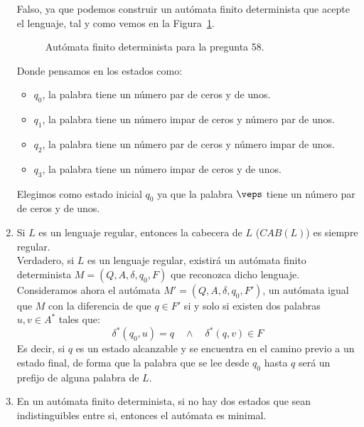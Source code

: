 \begin{enumerate}
        Falso, ya que podemos construir un autómata finito determinista que acepte el lenguaje, tal y como vemos en la Figura~\ref{fig:tipo_test58}.
       \begin{figure}[H]
           \centering
           \caption{Autómata finito determinista para la pregunta 58.}
           \label{fig:tipo_test58}
       \end{figure}
       Donde pensamos en los estados como:
       \begin{itemize}
           \item $q_0$, la palabra tiene un número par de ceros y de unos.
           \item $q_1$, la palabra tiene un número impar de ceros y número par de unos.
           \item $q_2$, la palabra tiene un número par de ceros y número impar de unos.
           \item $q_3$, la palabra tiene un número impar de ceros y de unos.
       \end{itemize}
       Elegimos como estado inicial $q_0$ ya que la palabra $\veps$ tiene un número par de ceros y de unos.
    \item Si $L$ es un lenguaje regular, entonces la cabecera de $L$ ($CAB(L)$) es siempre regular.\\

        Verdadero, si $L$ es un lenguaje regular, existirá un autómata finito determinista $M=(Q,A,\delta,q_0,F)$ que reconozca dicho lenguaje. Consideramos ahora el autómata $M'=(Q,A,\delta,q_0,F')$, un autómata igual que $M$ con la diferencia de que $q\in F'$ si y solo si existen dos palabras $u,v\in A^\ast$ tales que:
        \begin{equation*}
            \delta^\ast(q_0,u) = q \quad \land \quad \delta^\ast(q,v) \in F
        \end{equation*}
        Es decir, si $q$ es un estado alcanzable y se encuentra en el camino previo a un estado final, de forma que la palabra que se lee desde $q_0$ hasta $q$ será un prefijo de alguna palabra de $L$.
    \item En un autómata finito determinista, si no hay dos estados que sean indistinguibles entre si, entonces el autómata es minimal.\\


\end{enumerate}
